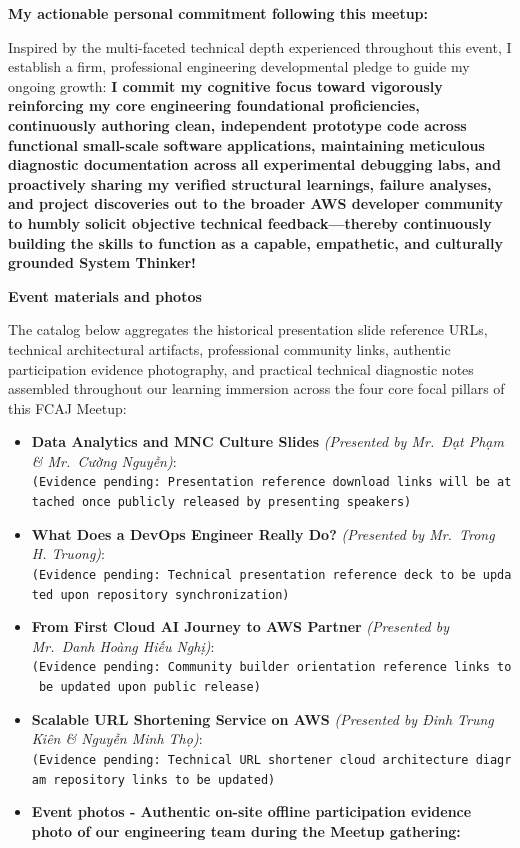 \vspace{0.5em}\noindent\textbf{My actionable personal commitment following this
meetup:}\par

Inspired by the multi-faceted technical depth experienced throughout
this event, I establish a firm, professional engineering developmental
pledge to guide my ongoing growth: \textbf{I commit my cognitive focus
toward vigorously reinforcing my core engineering foundational
proficiencies, continuously authoring clean, independent prototype code
across functional small-scale software applications, maintaining
meticulous diagnostic documentation across all experimental debugging
labs, and proactively sharing my verified structural learnings, failure
analyses, and project discoveries out to the broader AWS developer
community to humbly solicit objective technical feedback---thereby
continuously building the skills to function as a capable, empathetic,
and culturally grounded System Thinker!}

\vspace{0.5em}\noindent\textbf{Event materials and
photos}\par

The catalog below aggregates the historical presentation slide reference
URLs, technical architectural artifacts, professional community links,
authentic participation evidence photography, and practical technical
diagnostic notes assembled throughout our learning immersion across the
four core focal pillars of this FCAJ Meetup:

\begin{itemize}
\tightlist
\item
  \textbf{Data Analytics and MNC Culture Slides} \emph{(Presented by
  Mr.~Đạt Phạm \& Mr.~Cường Nguyễn)}:
  \texttt{(Evidence\ pending:\ Presentation\ reference\ download\ links\ will\ be\ attached\ once\ publicly\ released\ by\ presenting\ speakers)}
\item
  \textbf{What Does a DevOps Engineer Really Do?} \emph{(Presented by
  Mr.~Trong H. Truong)}:
  \texttt{(Evidence\ pending:\ Technical\ presentation\ reference\ deck\ to\ be\ updated\ upon\ repository\ synchronization)}
\item
  \textbf{From First Cloud AI Journey to AWS Partner} \emph{(Presented
  by Mr.~Danh Hoàng Hiếu Nghị)}:
  \texttt{(Evidence\ pending:\ Community\ builder\ orientation\ reference\ links\ to\ be\ updated\ upon\ public\ release)}
\item
  \textbf{Scalable URL Shortening Service on AWS} \emph{(Presented by
  Đinh Trung Kiên \& Nguyễn Minh Thọ)}:
  \texttt{(Evidence\ pending:\ Technical\ URL\ shortener\ cloud\ architecture\ diagram\ repository\ links\ to\ be\ updated)}
\item
  \textbf{Event photos - Authentic on-site offline participation
  evidence photo of our engineering team during the Meetup gathering:}
\end{itemize}

